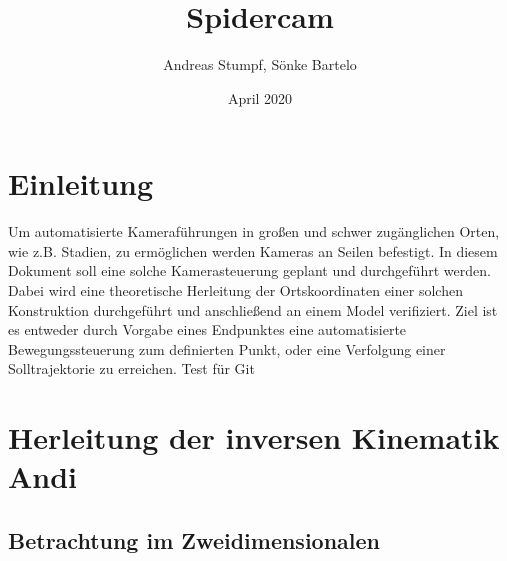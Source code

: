 \documentclass[a4paper, 12pt]{article}
\title{Spidercam}
\date{April 2020}
\author{Andreas Stumpf, Sönke Bartelo}
\begin{document}
	\maketitle
	\newpage
	\tableofcontents
	\pagebreak
	\listoffigures
	\pagebreak
	\section{Einleitung}
	Um automatisierte Kameraführungen in großen und schwer zugänglichen Orten, wie z.B. Stadien, zu ermöglichen werden Kameras an Seilen befestigt.
	In diesem Dokument soll eine solche Kamerasteuerung geplant und durchgeführt werden.
	Dabei wird eine theoretische Herleitung der Ortskoordinaten einer solchen Konstruktion durchgeführt und anschließend an einem Model verifiziert.
	Ziel ist es entweder durch Vorgabe eines Endpunktes eine automatisierte Bewegungssteuerung zum definierten Punkt, oder eine Verfolgung einer Solltrajektorie zu erreichen.
	Test für Git
	\pagebreak
	\section{Herleitung der inversen Kinematik Andi}
		\subsection{Betrachtung im Zweidimensionalen}
\end{document}

